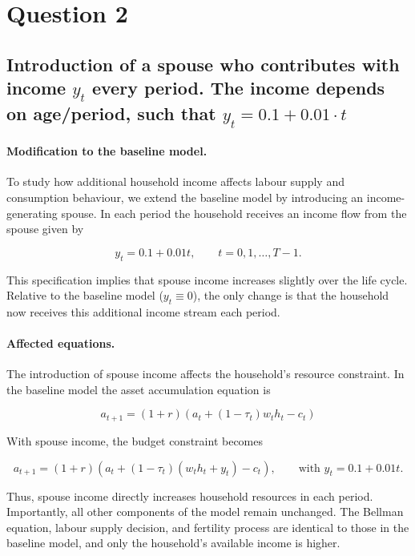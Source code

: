 \section{Question 2}

\subsection{Introduction of a spouse who contributes with income $y_t$ every period. The income depends on age/period, such that $y_t= 0.1+0.01\cdot t$}

\bigskip

\paragraph{Modification to the baseline model.}

To study how additional household income affects labour supply and consumption behaviour, we extend the baseline model by introducing an income-generating spouse. In each period the household receives an income flow from the spouse given by

\[
y_t = 0.1 + 0.01t, \qquad t = 0,1,\dots,T-1.
\]

This specification implies that spouse income increases slightly over the life cycle. Relative to the baseline model ($y_t \equiv 0$), the only change is that the household now receives this additional income stream each period.

\paragraph{Affected equations.}

The introduction of spouse income affects the household's resource constraint. In the baseline model the asset accumulation equation is

\[
a_{t+1} = (1+r)(a_t + (1-\tau_t) w_t h_t - c_t)
\]

With spouse income, the budget constraint becomes

\[
a_{t+1} = (1+r)(a_t + (1-\tau_t)(w_t h_t + y_t) - c_t),
\qquad \text{with } y_t = 0.1 + 0.01t.
\]

Thus, spouse income directly increases household resources in each period. Importantly, all other components of the model remain unchanged. The Bellman equation, labour supply decision, and fertility process are identical to those in the baseline model, and only the household's available income is higher.

